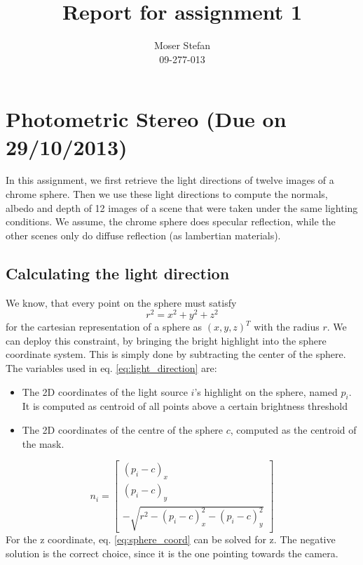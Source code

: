 \documentclass{paper}
\title{Report for assignment 1}
\author{Moser Stefan\\09-277-013}
\begin{document}
\maketitle

\section{Photometric Stereo (Due on 29/10/2013)}

In this assignment, we first retrieve the light directions of twelve images
of a chrome sphere. Then we use these light directions to compute the
normals, albedo and depth of 12 images of a scene that were taken under the
same lighting conditions. We assume, the chrome sphere does specular
 reflection, while the other scenes only do diffuse reflection (as
lambertian materials).

\subsection{Calculating the light direction} 
We know, that every point on the sphere must satisfy
\begin{equation}
	r^2 = x^2 + y^2 + z^2
\label{eq:sphere_coord}
\end{equation}
for the cartesian representation of a sphere as $(x,y,z)^T$ with the radius $r$. We can deploy this constraint, by bringing the bright
 highlight into the sphere coordinate system. This is simply done 
 by subtracting the center of the sphere. The variables used in eq. \ref{eq:light_direction} are:
\begin{itemize}
\item The 2D coordinates of the light source $i$'s highlight on the sphere, named $p_i$. It is computed as centroid of all points above a certain brightness threshold
\item The 2D coordinates of the centre of the sphere $c$, computed as the centroid of the mask.
\end{itemize}
\begin{equation}
	n_i = 
	\left[ 
	\begin{array}{c}
	(p_i - c)_x \\
	(p_i - c)_y \\
	-\sqrt{r^2 - (p_i - c)_x^2 - (p_i - c)_y^2}
\end{array} 
\right] 
\label{eq:light_direction}
\end{equation}
For the z coordinate, eq. \ref{eq:sphere_coord} can be solved for z. The negative solution is the correct choice, since it is the one pointing towards the camera.
\end{document}
